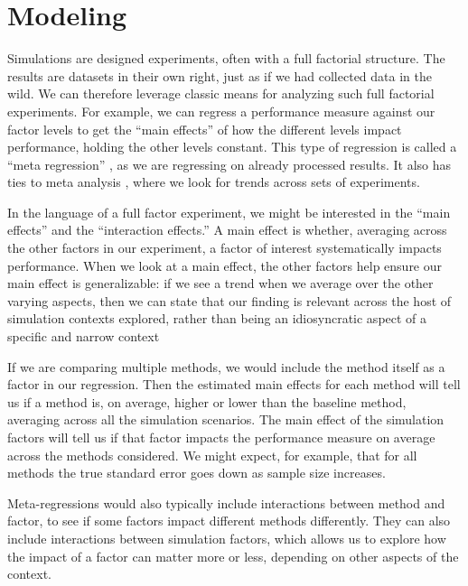 \documentclass[
]{book}
\begin{document}
\section{Modeling}\label{modeling}

Simulations are designed experiments, often with a full factorial structure.
The results are datasets in their own right, just as if we had collected data in the wild.
We can therefore leverage classic means for analyzing such full factorial experiments.
For example, we can regress a performance measure against our factor levels to get the ``main effects'' of how the different levels impact performance, holding the other levels constant.
This type of regression is called a ``meta regression'' \citep{kleijnen1981regression, friedman1988metamodel, gilbert2024multilevel}, as we are regressing on already processed results.
It also has ties to meta analysis \citep[see, e.g.,][]{borenstein2021introduction}, where we look for trends across sets of experiments.

In the language of a full factor experiment, we might be interested in the ``main effects'' and the ``interaction effects.''
A main effect is whether, averaging across the other factors in our experiment, a factor of interest systematically impacts performance.
When we look at a main effect, the other factors help ensure our main effect is generalizable: if we see a trend when we average over the other varying aspects, then we can state that our finding is relevant across the host of simulation contexts explored, rather than being an idiosyncratic aspect of a specific and narrow context

If we are comparing multiple methods, we would include the method itself as a factor in our regression.
Then the estimated main effects for each method will tell us if a method is, on average, higher or lower than the baseline method, averaging across all the simulation scenarios.
The main effect of the simulation factors will tell us if that factor impacts the performance measure on average across the methods considered.
We might expect, for example, that for all methods the true standard error goes down as sample size increases.

Meta-regressions would also typically include interactions between method and factor, to see if some factors impact different methods differently.
They can also include interactions between simulation factors, which allows us to explore how the impact of a factor can matter more or less, depending on other aspects of the context.
\end{document}
